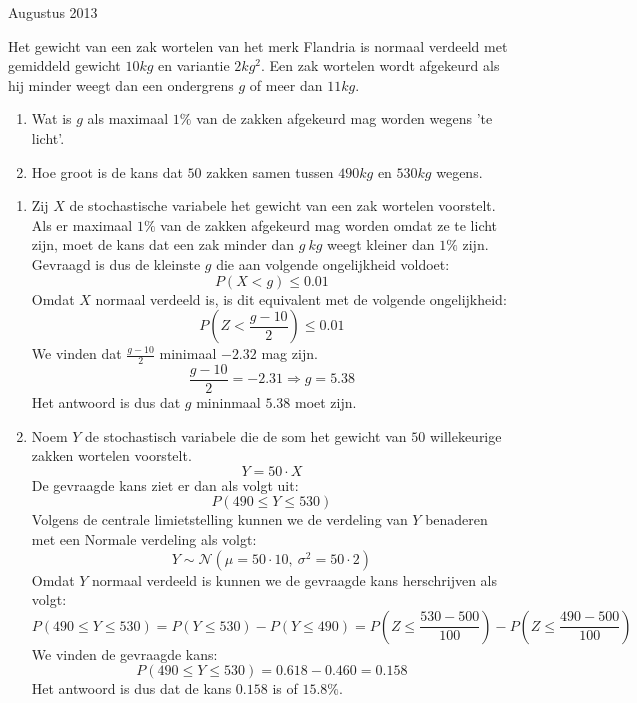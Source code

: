 \documentclass[main.tex]{subfiles}
\begin{document}
\begin{examenvraag}{Augustus 2013}
  \begin{ex-vraag}
    Het gewicht van een zak wortelen van het merk Flandria is normaal verdeeld met gemiddeld gewicht $10kg$ en variantie $2kg^2$.
    Een zak wortelen wordt afgekeurd als hij minder weegt dan een ondergrens $g$ of meer dan $11kg$.
    \begin{enumerate}
    \item Wat is $g$ als maximaal $1\%$ van de zakken afgekeurd mag worden wegens 'te licht'.
    \item Hoe groot is de kans dat $50$ zakken samen tussen $490kg$ en $530kg$ wegens.
    \end{enumerate}
  \end{ex-vraag}

  \begin{ex-antwoord}
    \begin{enumerate}
    \item
      Zij $X$ de stochastische variabele het gewicht van een zak wortelen voorstelt.
      Als er maximaal $1\%$ van de zakken afgekeurd mag worden omdat ze te licht zijn, moet de kans dat een zak minder dan $g\ kg$ weegt kleiner dan $1\%$ zijn.
      Gevraagd is dus de kleinste $g$ die aan volgende ongelijkheid voldoet:
      \[ P(X < g) \le 0.01 \]
      Omdat $X$ normaal verdeeld is, is dit equivalent met de volgende ongelijkheid:
      \[ P\left(Z < \frac{g-10}{2}\right) \le 0.01 \]
      We vinden dat $\frac{g-10}{2}$ minimaal $-2.32$ mag zijn.
      \[ \frac{g-10}{2} = -2.31 \Rightarrow g = 5.38 \]
      Het antwoord is dus dat $g$ mininmaal $5.38$ moet zijn.
    \item
      Noem $Y$ de stochastisch variabele die de som het gewicht van $50$ willekeurige zakken wortelen voorstelt.
      \[ Y = 50 \cdot X \]
      De gevraagde kans ziet er dan als volgt uit:
      \[ P(490 \le Y \le 530) \]
      Volgens de centrale limietstelling kunnen we de verdeling van $Y$ benaderen met een Normale verdeling als volgt:
      \[ Y \sim \mathcal{N}(\mu = 50 \cdot 10,\ \sigma^{2} = 50 \cdot 2) \]
      Omdat $Y$ normaal verdeeld is kunnen we de gevraagde kans herschrijven als volgt:
      \[ P(490 \le Y \le 530) = P(Y \le 530) - P(Y \le 490) = P\left( Z \le \frac{530-500}{100} \right) - P\left( Z \le \frac{490-500}{100}\right) \]
      We vinden de gevraagde kans:
      \[ P(490 \le Y \le 530) = 0.618 - 0.460 = 0.158 \]
      Het antwoord is dus dat de kans $0.158$ is of $15.8\%$.
    \end{enumerate}
  \end{ex-antwoord}
\end{examenvraag}
\end{document}
